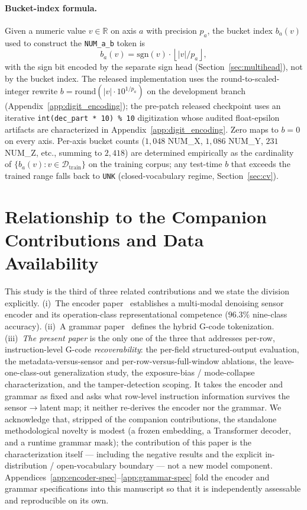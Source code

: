 \documentclass[sensors,article,submit,moreauthors,pdftex]{Definitions/mdpi}
\begin{document}
\paragraph{Bucket-index formula.} Given a numeric value $v\in\mathbb{R}$ on axis $a$ with precision $p_a$, the bucket index $b_a(v)$ used to construct the \texttt{NUM\_a\_b} token is
\begin{equation*}
b_a(v) = \mathrm{sgn}(v)\cdot\left\lfloor |v|/p_a \right\rfloor,
\end{equation*}
with the sign bit encoded by the separate sign head (Section~\ref{sec:multihead}), not by the bucket index. The released implementation uses the round-to-scaled-integer rewrite $b = \mathrm{round}(|v|\cdot 10^{1/p_a})$ on the development branch (Appendix~\ref{app:digit_encoding}); the pre-patch released checkpoint uses an iterative \texttt{int(dec\_part * 10) \% 10} digitization whose audited float-epsilon artifacts are characterized in Appendix~\ref{app:digit_encoding}. Zero maps to $b\!=\!0$ on every axis. Per-axis bucket counts ($1{,}048$ NUM\_X, $1{,}086$ NUM\_Y, $231$ NUM\_Z, etc., summing to $2{,}418$) are determined empirically as the cardinality of $\{b_a(v):v\in\mathcal{D}_{\text{train}}\}$ on the training corpus; any test-time $b$ that exceeds the trained range falls back to \texttt{UNK} (closed-vocabulary regime, Section~\ref{sec:cv}).

\section{Relationship to the Companion Contributions and Data Availability}
\label{app:companion}

This study is the third of three related contributions and we state the division explicitly. (i)~The encoder paper~\cite{encoder_paper} establishes a multi-modal denoising sensor encoder and its operation-class representational competence ($96.3\%$ nine-class accuracy). (ii)~A grammar paper~\cite{grammar_paper} defines the hybrid G-code tokenization. (iii)~\emph{The present paper} is the only one of the three that addresses per-row, instruction-level G-code \emph{recoverability}: the per-field structured-output evaluation, the metadata-versus-sensor and per-row-versus-full-window ablations, the leave-one-class-out generalization study, the exposure-bias / mode-collapse characterization, and the tamper-detection scoping. It takes the encoder and grammar as fixed and asks what row-level instruction information survives the sensor$\rightarrow$latent map; it neither re-derives the encoder nor the grammar. We acknowledge that, stripped of the companion contributions, the standalone methodological novelty is modest (a frozen embedding, a Transformer decoder, and a runtime grammar mask); the contribution of this paper is the characterization itself --- including the negative results and the explicit in-distribution / open-vocabulary boundary --- not a new model component. Appendices~\ref{app:encoder-spec}--\ref{app:grammar-spec} fold the encoder and grammar specifications into this manuscript so that it is independently assessable and reproducible on its own.
\end{document}
